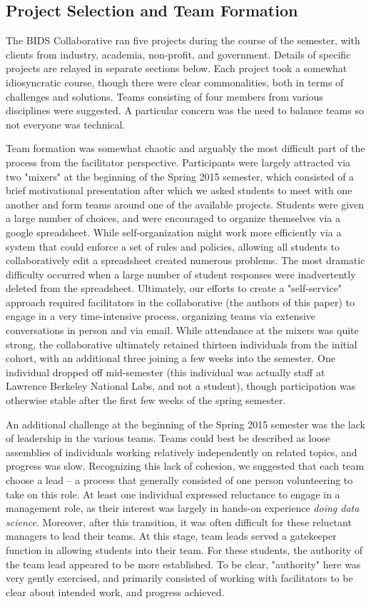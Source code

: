 \documentclass{sig-alternate}
\begin{document}
\subsection{Project Selection and Team Formation}

The BIDS Collaborative ran five projects during the course of the semester, with clients from industry, academia, non-profit, and government. Details of specific projects are relayed in separate sections below. Each project took a somewhat idiosyncratic course, though there were clear commonalities, both in terms of challenges and solutions. Teams consisting of four members from various disciplines were suggested. A particular concern was the need to balance teams so not everyone was technical.

Team formation was somewhat chaotic and arguably the most difficult part of the process from the facilitator perspective. Participants were largely attracted via two "mixers" at the beginning of the Spring 2015 semester, which consisted of a brief motivational presentation after which we asked students to meet with one another and form teams around one of the available projects. Students were given a large number of choices, and were encouraged to organize themselves via a google spreadsheet. While self-organization might work more efficiently via a system that could enforce a set of rules and policies, allowing all students to collaboratively edit a spreadsheet created numerous problems. The most dramatic difficulty occurred when a large number of student responses were inadvertently deleted from the spreadsheet. Ultimately, our efforts to create a "self-service" approach required facilitators in the collaborative (the authors of this paper) to engage in a very time-intensive process, organizing teams via extensive conversations in person and via email. While attendance at the mixers was quite strong, the collaborative ultimately retained thirteen individuals from the initial cohort, with an additional three joining a few weeks into the semester. One individual dropped off mid-semester (this individual was actually staff at Lawrence Berkeley National Labs, and not a student), though participation was otherwise stable after the first few weeks of the spring semester.

An additional challenge at the beginning of the Spring 2015 semester was the lack of leadership in the various teams. Teams could best be described as loose assemblies of individuals working relatively independently on related topics, and progress was slow. Recognizing this lack of cohesion, we suggested that each team choose a lead -- a process that generally consisted of one person volunteering to take on this role. At least one individual expressed reluctance to engage in a management role, as their interest was largely in hands-on experience \emph{doing data science}. Moreover, after this transition, it was often difficult for these reluctant managers to lead their teams.  At this stage, team leads served a gatekeeper function in allowing students into their team. For these students, the authority of the team lead appeared to be more established. To be clear, "authority" here was very gently exercised, and primarily consisted of working with facilitators to be clear about intended work, and progress achieved. 
\end{document}
